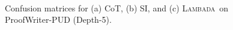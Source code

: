 \documentclass[11pt]{article}
\newcommand{\algo}{\textsc{Lambada}}
\begin{document}
\begin{figure}[t]
  \centering
~~~~\hspace*{0cm}
~~~~\hspace*{0cm}
  \caption{%
  \label{fig:confusion_matrices} %
  Confusion matrices for (a) CoT, (b) SI, and (c) \algo\ on ProofWriter-PUD (Depth-5).}
\end{figure}
\end{document}
